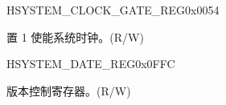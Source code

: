 \begin{register}{H}{SYSTEM\_CLOCK\_GATE\_REG}{0x0054}\label{regdesc:SYSTEMCLOCKGATEREG}
%
%
\regnewline%
\begin{regdesc}\begin{reglist}
\label{fielddesc:SYSTEMCLKEN}\item [SYSTEM\_CLK\_EN] 置 1 使能系统时钟。(R/W)
\end{reglist}\end{regdesc}
\end{register}


\begin{register}{H}{SYSTEM\_DATE\_REG}{0x0FFC}\label{regdesc:SYSTEMDATEREG}
%
%
\regnewline%
\begin{regdesc}\begin{reglist}
\label{fielddesc:SYSTEMSYSTEMREGDATE}\item [SYSTEM\_REG\_DATE] 版本控制寄存器。(R/W)
\end{reglist}\end{regdesc}
\end{register}
